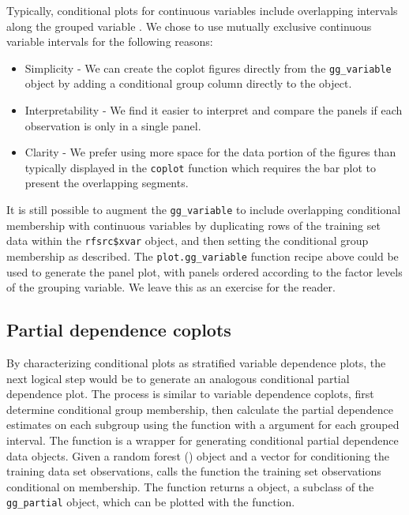 \documentclass[article]{jss}
\begin{document}
Typically, conditional plots for continuous variables include
overlapping intervals along the grouped variable \citep{cleveland:1993}.
We chose to use mutually exclusive continuous variable intervals for the
following reasons:

\begin{itemize}
\item
  Simplicity - We can create the coplot figures directly from the
  \texttt{gg\_variable} object by adding a conditional group column
  directly to the object.
\item
  Interpretability - We find it easier to interpret and compare the
  panels if each observation is only in a single panel.
\item
  Clarity - We prefer using more space for the data portion of the
  figures than typically displayed in the \texttt{coplot} function which
  requires the bar plot to present the overlapping segments.
\end{itemize}

It is still possible to augment the \texttt{gg\_variable} to include
overlapping conditional membership with continuous variables by
duplicating rows of the training set data within the
\texttt{rfsrc\$xvar} object, and then setting the conditional group
membership as described. The \texttt{plot.gg\_variable} function recipe
above could be used to generate the panel plot, with panels ordered
according to the factor levels of the grouping variable. We leave this
as an exercise for the reader.

\subsection{Partial dependence
coplots}\label{partial-dependence-coplots}

By characterizing conditional plots as stratified variable dependence
plots, the next logical step would be to generate an analogous
conditional partial dependence plot. The process is similar to variable
dependence coplots, first determine conditional group membership, then
calculate the partial dependence estimates on each subgroup using the
 function with a  argument for each
grouped interval. The  
function is a wrapper for generating conditional partial dependence data
objects. Given a random forest () object and a 
vector for conditioning the training data set observations,
 calls the  function the
training set observations conditional on  membership. The
function returns a  object, a subclass of the
\texttt{gg\_partial} object, which can be plotted with the
 function.
\end{document}
